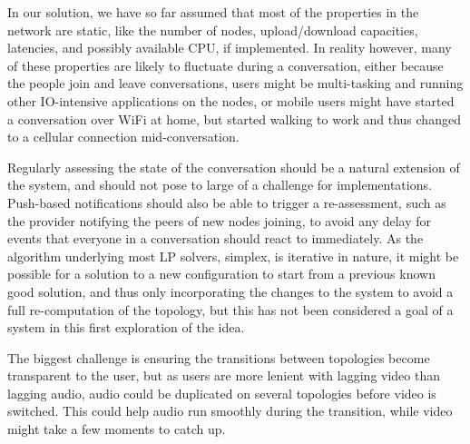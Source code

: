 In our solution, we have so far assumed that most of the properties in the network are static, like the number of nodes, upload/download capacities, latencies, and possibly available CPU, if implemented. In reality however, many of these properties are likely to fluctuate during a conversation, either because the people join and leave conversations, users might be multi-tasking and running other IO-intensive applications on the nodes, or mobile users might have started a conversation over WiFi at home, but started walking to work and thus changed to a cellular connection mid-conversation.

Regularly assessing the state of the conversation should be a natural extension of the system, and should not pose to large of a challenge for implementations. Push-based notifications should also be able to trigger a re-assessment, such as the provider notifying the peers of new nodes joining, to avoid any delay for events that everyone in a conversation should react to immediately. As the algorithm underlying most LP solvers, simplex, is iterative in nature, it might be possible for a solution to a new configuration to start from a previous known good solution, and thus only incorporating the changes to the system to avoid a full re-computation of the topology, but this has not been considered a goal of a system in this first exploration of the idea.

The biggest challenge is ensuring the transitions between topologies become transparent to the user, but as users are more lenient with lagging video than lagging audio, audio could be duplicated on several topologies before video is switched. This could help audio run smoothly during the transition, while video might take a few moments to catch up.
